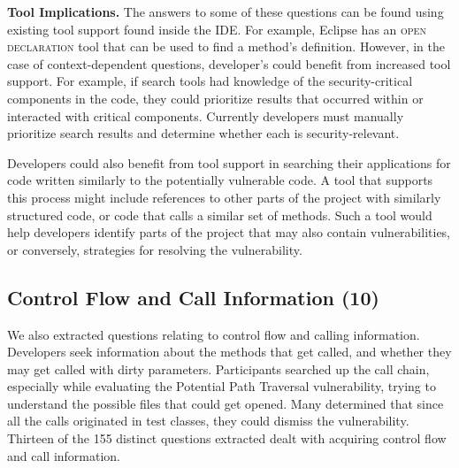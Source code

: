\documentclass[conference]{IEEEtran}
\begin{document}
\noindent\textbf{Tool Implications.}
The answers to some of these questions can be found using existing tool support found inside the IDE. 
For example, Eclipse has an \textsc{open declaration} tool that can be used to find a method's definition. 
However, in the case of context-dependent questions, developer's could benefit from increased tool support. 
For example, if search tools had knowledge of the security-critical components in the code, they could prioritize results that occurred within or interacted with critical components.
Currently developers must manually prioritize search results and determine whether each is security-relevant.

Developers could also benefit from tool support in searching their applications for code written similarly to the potentially vulnerable code. 
A tool that supports this process might include references to other parts of the project with similarly structured code, or code that calls a similar set of methods. 
Such a tool would help developers identify parts of the project that may also contain vulnerabilities, or conversely, strategies for resolving the vulnerability.



\noindent\subsection{\textbf{Control Flow and Call Information (10)}}\label{cf}
We also extracted questions relating to control flow and calling information. 
Developers seek information about the methods that get called, and whether they may get called with dirty parameters.
Participants searched up the call chain, especially while evaluating the Potential Path Traversal vulnerability, trying to understand the possible files that could get opened. 
Many determined that since all the calls originated in test classes, they could dismiss the vulnerability.
Thirteen of the 155 distinct questions extracted dealt with acquiring control flow and call information.
\\
\end{document}

